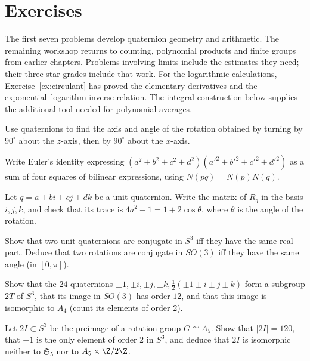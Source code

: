 \section{Exercises}

The first seven problems develop quaternion geometry and arithmetic. The
remaining workshop returns to counting, polynomial products and finite groups
from earlier chapters. Problems involving limits include the estimates they
need; their three-star grades include that work. For the logarithmic calculations,
Exercise~\ref{ex:circulant} has proved the elementary derivatives and the
exponential--logarithm inverse relation. The integral construction below supplies
the additional tool needed for polynomial averages.

\begin{exercise}[$\star$]\label{ex:compose}
Use quaternions to find the axis and angle of the rotation obtained by turning by $90^\circ$ about the $z$-axis, then by $90^\circ$ about the $x$-axis.
\end{exercise}

\begin{exercise}[$\star$]\label{ex:euler4}
Write Euler's identity expressing $(a^2+b^2+c^2+d^2)(a'^2+b'^2+c'^2+d'^2)$ as a sum of four squares of bilinear expressions, using $N(pq)=N(p)N(q)$.
\end{exercise}

\begin{exercise}[$\star\star$]\label{ex:rotmatrix}
Let $q=a+bi+cj+dk$ be a unit quaternion. Write the matrix of $R_q$ in the basis $i,j,k$, and check that its trace is $4a^2-1=1+2\cos\theta$, where $\theta$ is the angle of the rotation.
\end{exercise}

\begin{exercise}[$\star\star$]\label{ex:conjS3}
Show that two unit quaternions are conjugate in $S^3$ iff they have the same real part. Deduce that two rotations are conjugate in $SO(3)$ iff they have the same angle (in $[0,\pi]$).
\end{exercise}

\begin{exercise}[$\star\star$]\label{ex:2T}
Show that the $24$ quaternions $\pm1,\pm i,\pm j,\pm k,\frac12(\pm1\pm i\pm j\pm k)$ form a subgroup $2T$ of $S^3$, that its image in $SO(3)$ has order $12$, and that this image is isomorphic to $A_4$ (count its elements of order $2$).
\end{exercise}

\begin{exercise}[$\star\star$]\label{ex:2I}
Let $2I\subset S^3$ be the preimage of a rotation group $G\cong A_5$. Show that $|2I|=120$, that $-1$ is the only element of order $2$ in $S^3$, and deduce that $2I$ is isomorphic neither to $\mathfrak S_5$ nor to $A_5\times\Z/2\Z$.
\end{exercise}

